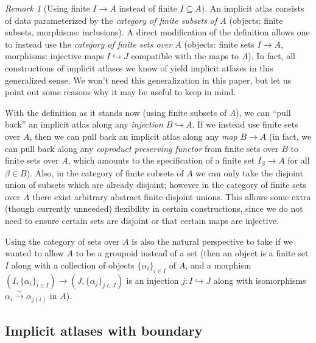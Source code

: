 \documentclass[12pt]{article}
\theoremstyle{definition}
\theoremstyle{remark}
\newtheorem{remark}[theorem]{Remark}
\numberwithin{equation}{subsection}
\begin{document}
\begin{remark}[Using finite $I\to A$ instead of finite $I\subseteq A$]\label{bettertouseovercategory}
An implicit atlas consists of data parameterized by the \emph{category of finite subsets of $A$} (objects: finite subsets, morphisms: inclusions).  A direct modification of the definition allows one to instead use the \emph{category of finite sets over $A$} (objects: finite sets $I\to A$, morphisms: injective maps $I\hookrightarrow J$ compatible with the maps to $A$).  In fact, all constructions of implicit atlases we know of yield implicit atlases in this generalized sense.  We won't need this generalization in this paper, but let us point out some reasons why it may be useful to keep in mind.

With the definition as it stands now (using finite subsets of $A$), we can ``pull back'' an implicit atlas along any \emph{injection} $B\hookrightarrow A$.  If we instead use finite sets over $A$, then we can pull back an implicit atlas along any \emph{map} $B\to A$ (in fact, we can pull back along any \emph{coproduct preserving functor} from finite sets over $B$ to finite sets over $A$, which amounts to the specification of a finite set $I_\beta\to A$ for all $\beta\in B$).  Also, in the category of finite subsets of $A$ we can only take the disjoint union of subsets which are already disjoint; however in the category of finite sets over $A$ there exist arbitrary abstract finite disjoint unions.  This allows some extra (though currently unneeded) flexibility in certain constructions, since we do not need to ensure certain sets are disjoint or that certain maps are injective.

Using the category of sets over $A$ is also the natural perspective to take if we wanted to allow $A$ to be a groupoid instead of a set (then an object is a finite set $I$ along with a collection of objects $\{\alpha_i\}_{i\in I}$ of $A$, and a morphism $(I,\{\alpha_i\}_{i\in I})\to(J,\{\alpha_j\}_{j\in J})$ is an injection $j:I\hookrightarrow J$ along with isomorphisms $\alpha_i\xrightarrow\sim\alpha_{j(i)}$ in $A$).
\end{remark}

\subsection{Implicit atlases with boundary}
\end{document}
